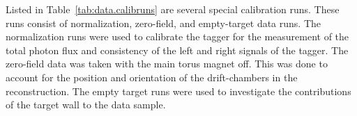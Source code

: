 Listed in Table~\ref{tab:data.calibruns} are several special calibration runs. These runs consist of normalization, zero-field, and empty-target data runs. The normalization runs were used to calibrate the tagger for the measurement of the total photon flux and consistency of the left and right  signals of the tagger. The zero-field data was taken with the main torus magnet off. This was done to account for the position and orientation of the drift-chambers in the reconstruction. The empty target runs were used to investigate the contributions of the target wall to the data sample.
 

%
\FloatBarrier
\newpage
